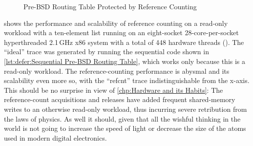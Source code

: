 \begin{figure}
\centering
{}
\caption{Pre-BSD Routing Table Protected by Reference Counting}
\label{fig:defer:Pre-BSD Routing Table Protected by Reference Counting}
\end{figure}

shows the performance and scalability of reference counting on a
read-only workload with a ten-element list running on an eight-socket
28-core-per-socket hyperthreaded 2.1\,GHz x86 system with a total of
448 hardware threads ().
The ``ideal'' trace was generated by running the sequential code shown in
\cref{lst:defer:Sequential Pre-BSD Routing Table},
which works only because this is a read-only workload.
The reference-counting performance is abysmal and its scalability even
more so, with the ``refcnt'' trace indistinguishable from the x-axis.
This should be no surprise in view of
\cref{chp:Hardware and its Habits}:
The reference-count acquisitions and releases have added frequent
shared-memory writes to an otherwise read-only workload, thus
incurring severe retribution from the laws of physics.
As well it should, given that all the wishful thinking in the world
is not going to increase the speed of light or decrease the size of
the atoms used in modern digital electronics.

